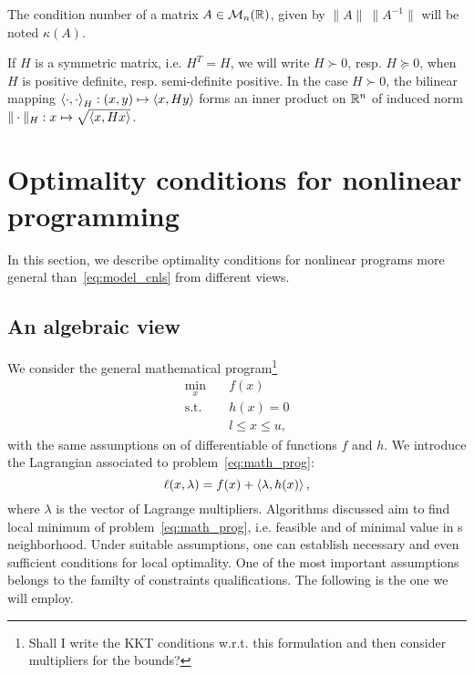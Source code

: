 \documentclass[10pt]{article}
\numberwithin{equation}{section}
\begin{document}
	The condition number of a matrix $A\in {\mathcal{M}}_n({\mathbb{R}})$, given by $\|A\|\ \|A^{-1}\|$ will be noted $\kappa(A)$. 
	
	If $H$ is a symmetric matrix, i.e. $H^T=H$, we will write $H \succ 0$, resp. $H \succeq 0$, when $H$ is positive definite, resp. semi-definite positive. In the case $H\succ 0$, the bilinear mapping $\left\langle {\cdot} , {\cdot} \right\rangle_H:(x,y) \mapsto \left\langle {x} , {Hy} \right\rangle $ forms an inner product on ${\mathbb{R}}^n$ of induced norm $\|\cdot\|_H:x\mapsto \sqrt{\left\langle {x} , {Hx} \right\rangle}$.
	
	
	\section{Optimality conditions for nonlinear programming}\label{sec:nlp_optimality_conditions}
	
	In this section, we describe optimality conditions for nonlinear programs more general than~\eqref{eq:model_cnls} from different views.
	
	\subsection{An algebraic view}
	
	We consider the general mathematical program\footnote{Shall I write the KKT conditions w.r.t. this formulation and then consider multipliers for the bounds?}
	\begin{equation}
		\label{eq:math_prog}
		\begin{aligned}
			\min_x \quad & f(x) \\
			\text{s.t.} \quad & h(x)=0 \\
			& l \le x \le u,
		\end{aligned}
	\end{equation}
	with the same assumptions on of differentiable of functions $f$ and \(h\). We introduce the Lagrangian associated to problem~\eqref{eq:math_prog}:
	\begin{equation}
		\label{eq:lagrangian}
		\ell(x,\lambda) = f(x) + \left\langle {\lambda} , {h(x)} \right\rangle,
	\end{equation}
	where $\lambda$ is the vector of Lagrange multipliers. Algorithms discussed aim to find local minimum of problem~\eqref{eq:math_prog}, i.e. feasible and of minimal value in s neighborhood. Under suitable assumptions, one can establish necessary and even sufficient conditions for local optimality. One of the most important assumptions belongs to the familty of constraints qualifications. The following is the one we will employ.
	
\end{document}
